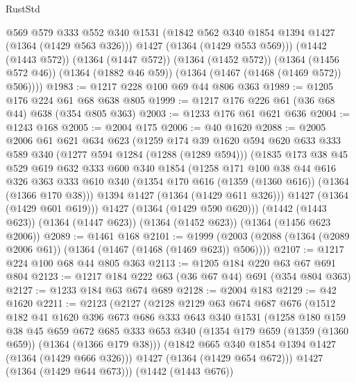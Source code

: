 \begin{lexlean}{RustStd}
\begin{coremodule}
          @569
          @579
          @333
          @552
          @340
          @1531
          (@1842 @562 @340 @1854 @1394 @1427 (@1364 (@1429 @563 @326)))
          @1427
          (@1364 (@1429 @553 @569)))
        (@1442 (@1443 @572))
        (@1364 (@1447 @572))
        (@1364 (@1452 @572))
        (@1364 (@1456 @572 @46))
        (@1364 (@1882 @46 @59))
        (@1364 (@1467 (@1468 (@1469 @572)) @506))))
@1983 := @1217 @228 @100 @69 @44 @806 @363
@1989 := @1205 @176 @224 @61 @68 @638 @805
@1999 := @1217 @176 @226 @61 (@36 @68 @44) @638 (@354 @805 @363)
@2003 := @1233 @176 @61 @621 @636
@2004 := @1243 @168
@2005 := @2004 @175
@2006 := @40 @1620
@2088 := @2005
    @2006
    @61
    @621
    @634
    @623
    (@1259
      @174
      @39
      @1620
      @594
      @620
      @633
      @333
      @589
      @340
      (@1277 @594 @1284 (@1288 (@1289 @594)))
      (@1835
        @173
        @38
        @45
        @529
        @619
        @632
        @333
        @600
        @340
        @1854
        (@1258
          @171
          @100
          @38
          @44
          @616
          @326
          @363
          @333
          @610
          @340
          (@1354 @170 @616 (@1359 (@1360 @616)) (@1364 (@1366 @170 @38)))
          @1394
          @1427
          (@1364 (@1429 @611 @326)))
        @1427
        (@1364 (@1429 @601 @619)))
      @1427
      (@1364 (@1429 @590 @620)))
    (@1442 (@1443 @623))
    (@1364 (@1447 @623))
    (@1364 (@1452 @623))
    (@1364 (@1456 @623 @2006))
@2089 := @1461 @168
@2101 := @1999 (@2003 (@2088 (@1364 (@2089 @2006 @61)) (@1364 (@1467 (@1468 (@1469 @623)) @506))))
@2107 := @1217 @224 @100 @68 @44 @805 @363
@2113 := @1205 @184 @220 @63 @67 @691 @804
@2123 := @1217 @184 @222 @63 (@36 @67 @44) @691 (@354 @804 @363)
@2127 := @1233 @184 @63 @674 @689
@2128 := @2004 @183
@2129 := @42 @1620
@2211 := @2123
    (@2127
      (@2128
        @2129
        @63
        @674
        @687
        @676
        (@1512
          @182
          @41
          @1620
          @396
          @673
          @686
          @333
          @643
          @340
          @1531
          (@1258
            @180
            @159
            @38
            @45
            @659
            @672
            @685
            @333
            @653
            @340
            (@1354 @179 @659 (@1359 (@1360 @659)) (@1364 (@1366 @179 @38)))
            (@1842 @665 @340 @1854 @1394 @1427 (@1364 (@1429 @666 @326)))
            @1427
            (@1364 (@1429 @654 @672)))
          @1427
          (@1364 (@1429 @644 @673)))
        (@1442 (@1443 @676))

\end{coremodule}
\end{lexlean}
